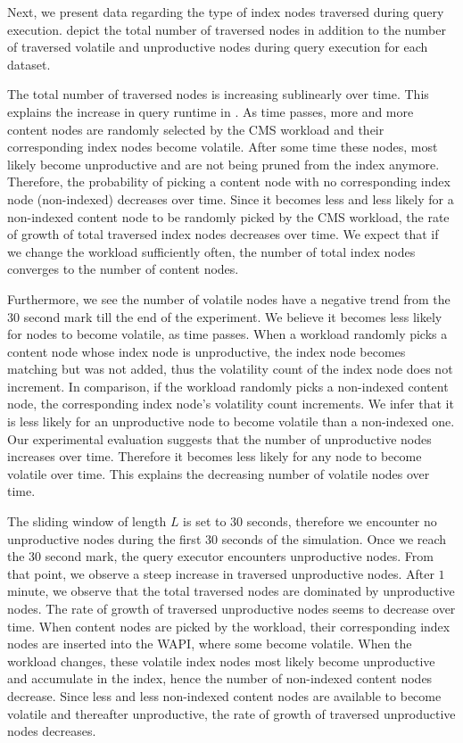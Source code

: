 \documentclass[abstracton,12pt]{scrartcl}
\theoremstyle{definition}
\begin{document}
Next, we present data regarding the type of index nodes traversed during query
execution.
 depict
the total number of traversed nodes in addition to the number of traversed
volatile and unproductive nodes during query execution for each dataset.

The total number of traversed nodes is increasing sublinearly over time. This
explains the increase in query runtime in
.
As time passes, more and more content nodes are randomly
selected by the CMS workload and their corresponding index nodes become
volatile. After some time these nodes, most likely become unproductive and are
not  being pruned from the index anymore.
Therefore, the probability of picking a content node with no corresponding index
node (non-indexed)
decreases over time. Since it becomes less and less likely for a non-indexed content node
to be randomly picked by the CMS workload, the rate of growth of total traversed
index nodes decreases over time. We expect that if we change the workload
sufficiently often, the number of total index nodes converges to the number of
content nodes.

Furthermore, we see the number of volatile nodes have a negative trend from the
30 second mark till the end of the experiment. We believe it becomes less likely
for nodes to become volatile,
as time passes. When a workload randomly picks a content node whose index node is
unproductive, the index
node becomes matching but was not added, thus the volatility count of the index node
does not increment. In comparison, if the workload randomly picks a non-indexed
content node, the corresponding index node's volatility count increments.
We infer that it is less
likely for an unproductive node to become volatile than a non-indexed one.
Our experimental evaluation suggests that the number of
unproductive nodes increases over time. Therefore it becomes less likely for any
node to become volatile over time. This explains the decreasing number of
volatile nodes over time.

The sliding window of length $L$ is set to $30$ seconds, therefore we encounter no
unproductive nodes during the first $30$ seconds of the simulation. Once we
reach the $30$ second mark, the query executor encounters unproductive nodes.
From that point, we observe a steep increase in traversed unproductive nodes.
After $1$ minute, we observe that the total traversed nodes are dominated by
unproductive nodes. The rate of growth of traversed unproductive nodes seems to
decrease over time. When content nodes are picked by the
workload, their corresponding index nodes are inserted into the WAPI, where some
become volatile. When the workload changes, these volatile index nodes most
likely become unproductive and accumulate in the index, hence the number of non-indexed
content nodes decrease. Since less and less non-indexed content nodes are
available to become volatile and thereafter unproductive, the rate of growth of
traversed unproductive nodes decreases.
\end{document}
